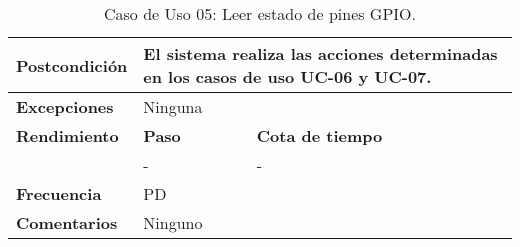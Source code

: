 \begin{table}[H]
{\begin{tabular}{|l|p{1cm}|p{9cm}|}
                            \textbf{Postcondición} & \multicolumn{2}{|p{10cm}|}{El sistema realiza las acciones determinadas en los casos de uso UC-06 y UC-07.} \\ \hline
                            \textbf{Excepciones} & \multicolumn{2}{|p{10cm}|}{Ninguna} \\ \hline
                            \textbf{Rendimiento} & \textbf{Paso} & \textbf{Cota de tiempo} \\ \cline{2-3} & - & - \\ \hline
                            \textbf{Frecuencia} & \multicolumn{2}{|p{10cm}|}{PD} \\ \hline
                            \textbf{Comentarios} & \multicolumn{2}{|p{10cm}|}{Ninguno} \\ \hline
                        \end{tabular}
                        }
                        \caption{Caso de Uso 05: Leer estado de pines GPIO.}
                        \label{UC05_sys}
                    \end{table}
                    
